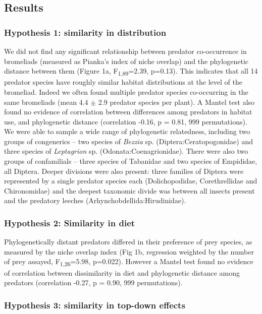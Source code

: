 \subsection{Results}\label{results}

\subsubsection{Hypothesis 1: similarity in
distribution}\label{hypothesis-1-similarity-in-distribution}

We did not find any significant relationship between predator
co-occurrence in bromeliads (measured as Pianka's index of niche
overlap) and the phylogenetic distance between them (Figure 1a,
F\textsubscript{1,89}=2.39, p=0.13). This indicates that all 14 predator
species have roughly similar habitat distributions at the level of the
bromeliad. Indeed we often found multiple predator species co-occurring
in the same bromeliads (mean 4.4 $\pm$ 2.9 predator species per plant). A
Mantel test also found no evidence of correlation between differences
among predators in habitat use, and phylogenetic distance (correlation
-0.16, p = 0.81, 999 permutations). We were able to sample a wide range
of phylogenetic relatedness, including two groups of congenerics -- two
species of \emph{Bezzia} sp. (Diptera:Ceratopogonidae) and three species
of \emph{Leptagrion} sp. (Odonata:Coenagrionidae). There were also two
groups of confamilials -- three species of Tabanidae and two species of
Empididae, all Diptera. Deeper divisions were also present: three
families of Diptera were represented by a single predator species each
(Dolichopodidae, Corethrellidae and Chironomidae) and the deepest
taxonomic divide was between all insects present and the predatory
leeches (Arhynchobdellida:Hirudinidae).

\subsubsection{Hypothesis 2: Similarity in
diet}\label{hypothesis-2-similarity-in-diet}

Phylogenetically distant predators differed in their preference of prey
species, as measured by the niche overlap index (Fig 1b, regression
weighted by the number of prey assayed, F\textsubscript{1,26}=5.98,
p=0.022). However a Mantel test found no evidence of correlation between
dissimilarity in diet and phylogenetic distance among predators
(correlation -0.27, p = 0.90, 999 permutations).

\subsubsection{Hypothesis 3: similarity in top-down
effects}\label{hypothesis-3-similarity-in-top-down-effects}

